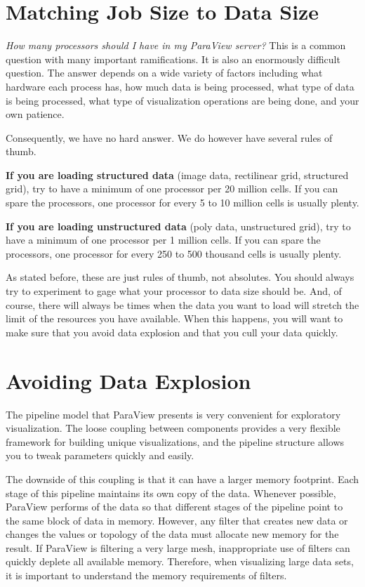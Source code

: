 \section{Matching Job Size to Data Size}

\emph{How many processors should I have in my ParaView server?}  This is a
common question with many important ramifications.  It is also an
enormously difficult question.  The answer depends on a wide variety of
factors including what hardware each process has, how much data is being
processed, what type of data is being processed, what type of visualization
operations are being done, and your own patience.

Consequently, we have no hard answer.  We do however have several rules of thumb.

\textbf{If you are loading structured data} (image data, rectilinear grid,
structured grid), try to have a minimum of one processor per 20 million
cells.  If you can spare the processors, one processor for every 5 to 10
million cells is usually plenty.

\textbf{If you are loading unstructured data} (poly data, unstructured
grid), try to have a minimum of one processor per 1 million cells.  If you
can spare the processors, one processor for every 250 to 500 thousand cells
is usually plenty.

As stated before, these are just rules of thumb, not absolutes.  You should
always try to experiment to gage what your processor to data size should
be.  And, of course, there will always be times when the data you want to
load will stretch the limit of the resources you have available.  When this
happens, you will want to make sure that you avoid data explosion and that
you cull your data quickly.


\section{Avoiding Data Explosion}

The pipeline model that ParaView presents is very convenient for
exploratory visualization.  The loose coupling between components provides
a very flexible framework for building unique visualizations, and the
pipeline structure allows you to tweak parameters quickly and easily.

The downside of this coupling is that it can have a larger memory
footprint.  Each stage of this pipeline maintains its own copy of the data.
Whenever possible, ParaView performs  of the data
so that different stages of the pipeline point to the same block of data in
memory.  However, any filter that creates new data or changes the values or
topology of the data must allocate new memory for the result.  If ParaView
is filtering a very large mesh, inappropriate use of filters can quickly
deplete all available memory.  Therefore, when visualizing large data sets,
it is important to understand the memory requirements of filters.

